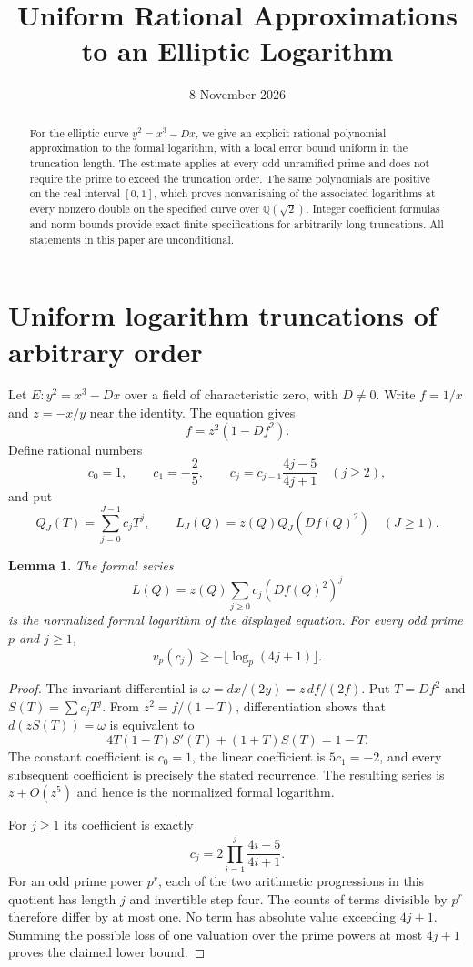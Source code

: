 \documentclass[11pt,a4paper]{article}
\title{Uniform Rational Approximations\\to an Elliptic Logarithm}
\author{}\date{8 November 2026}
\newtheorem{lemma}[theorem]{Lemma}
\theoremstyle{definition}\newtheorem{definition}[theorem]{Definition}
\begin{document}
\maketitle
\begin{abstract}
For the elliptic curve $y^2=x^3-Dx$, we give an explicit rational
polynomial approximation to the formal logarithm, with a local error
bound uniform in the truncation length. The estimate applies at every
odd unramified prime and does not require the prime to exceed the
truncation order. The same polynomials are positive on the real
interval $[0,1]$, which proves nonvanishing of the associated
logarithms at every nonzero double on the specified curve over
$\mathbb Q(\sqrt2)$. Integer coefficient formulas and norm bounds
provide exact finite specifications for arbitrarily long truncations.
All statements in this paper are unconditional.
\end{abstract}
\section{Uniform logarithm truncations of arbitrary order}
\label{sec:uniform-logarithm}

Let $E:y^2=x^3-Dx$ over a field of characteristic zero, with $D\ne0$.
Write $f=1/x$ and $z=-x/y$ near the identity. The equation gives
\[
                         f=z^2(1-Df^2).
\]
Define rational numbers
\[
 c_0=1,\qquad c_1=-\frac25,\qquad
 c_j=c_{j-1}\frac{4j-5}{4j+1}\quad(j\ge2),
\]
and put
\[
 Q_J(T)=\sum_{j=0}^{J-1}c_jT^j,
 \qquad L_J(Q)=z(Q)Q_J(Df(Q)^2)\quad(J\ge1).
\]

\begin{lemma}\label{lem:logarithm-series}
The formal series
\[
                  L(Q)=z(Q)\sum_{j\ge0}c_j(Df(Q)^2)^j
\]
is the normalized formal logarithm of the displayed equation.
For every odd prime $p$ and $j\ge1$,
\[
                  v_p(c_j)\ge-\lfloor\log_p(4j+1)\rfloor.
\]
\end{lemma}
\begin{proof}
The invariant differential is
$\omega=dx/(2y)=z\,df/(2f)$. Put $T=Df^2$ and $S(T)=\sum c_jT^j$.
From $z^2=f/(1-T)$, differentiation shows that $d(zS(T))=\omega$
is equivalent to
\[
                 4T(1-T)S'(T)+(1+T)S(T)=1-T.
\]
The constant coefficient is $c_0=1$, the linear coefficient is
$5c_1=-2$, and every subsequent coefficient is precisely the stated
recurrence. The resulting series is $z+O(z^5)$ and hence is the
normalized formal logarithm.

For $j\ge1$ its coefficient is exactly
\[
                 c_j=2\prod_{i=1}^j\frac{4i-5}{4i+1}.
\]
For an odd prime power $p^r$, each of the two arithmetic progressions
in this quotient has length $j$ and invertible step four. The counts
of terms divisible by $p^r$ therefore differ by at most one.
No term has absolute value exceeding $4j+1$. Summing the possible
loss of one valuation over the prime powers at most $4j+1$ proves
the claimed lower bound.
\end{proof}
\end{document}
